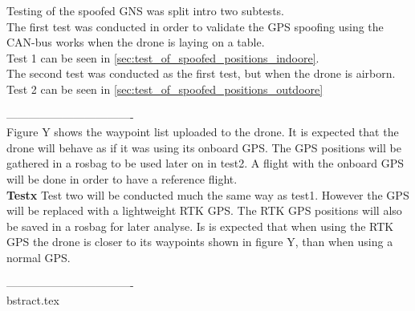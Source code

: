 Testing of the spoofed GNS was split intro two subtests. \\
The first test was conducted in order to validate the GPS spoofing using the CAN-bus works when the drone is laying on a table. \\
Test 1 can be seen in \ref{sec:test_of_spoofed_positions_indoore}.\\
The second test was conducted as the first test, but when the drone is airborn.\\
Test 2 can be seen in \ref{sec:test_of_spoofed_positions_outdoore}



----------------------------------\\
Figure Y shows the waypoint list uploaded to the drone. It is expected that the drone will behave as if it was using its onboard GPS.
The GPS positions will be gathered in a rosbag to be used later on in test2.
A flight with the onboard GPS will be done in order to have a reference flight.\\
\textbf{Testx}
Test two will be conducted much the same way as test1. However the GPS will be replaced with a lightweight RTK GPS. The RTK GPS positions will also be saved in a rosbag for later analyse. Is is expected that when using the RTK GPS the drone is closer to its waypoints  shown in figure Y, than when using a normal GPS.

----------------------------------\\




bstract.tex

